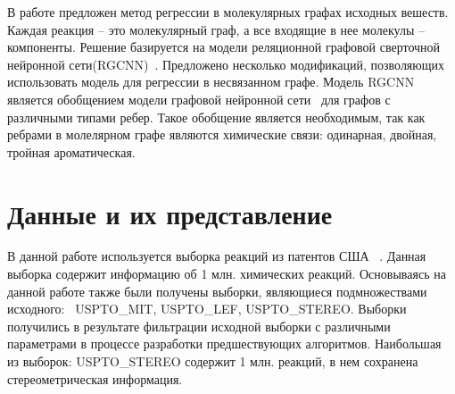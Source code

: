 \documentclass[12pt, twoside]{article}
\begin{document}
В работе предложен метод регрессии в молекулярных графах исходных вешеств.  Каждая реакция -- это молекулярный граф, а все входящие в нее молекулы -- компоненты. Решение базируется на модели реляционной графовой сверточной нейронной сети(RGCNN)~\cite{schlichtkrull2018modeling}. Предложено несколько модификаций, позволяющих использовать модель для регрессии в несвязанном графе.  Модель RGCNN является обобщением модели графовой нейронной сети~\cite{kipf2016semi} для графов с различными типами ребер. Такое обобщение является необходимым, так как ребрами в молелярном графе являются химические связи: одинарная, двойная, тройная ароматическая.

\section{Данные и их представление}

В данной работе используется выборка реакций из патентов США ~\cite{lowe2012extraction}. Данная выборка содержит информацию об 1 млн. химических реакций. Основываясь на данной работе также были получены выборки, являющиеся подмножествами исходного: ~USPTO\_MIT, USPTO\_LEF, USPTO\_STEREO. Выборки получились в результате фильтрации исходной выборки с различными параметрами в процессе разработки  предшествующих алгоритмов. Наибольшая из выборок: USPTO\_STEREO содержит 1 млн. реакций, в нем сохранена стереометрическая информация. 
\end{document}
